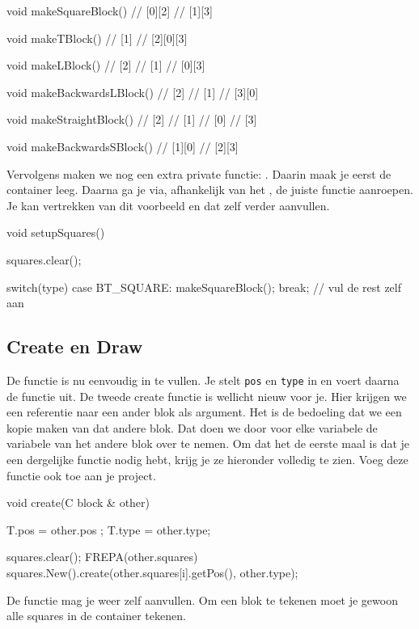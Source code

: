 \begin{code}
void makeSquareBlock()
{
	// [0][2]
	// [1][3]
}

void makeTBlock()
{
	//    [1]
	// [2][0][3]
}

void makeLBlock()
{
	// [2]
	// [1]
	// [0][3]  
}

void makeBackwardsLBlock()
{
	//    [2]
	//    [1]
	// [3][0]  
}

void makeStraightBlock()
{
	// [2]
	// [1]
	// [0]
	// [3] 
}

void makeBackwardsSBlock() 
{
	// [1][0]
	//    [2][3]
}
\end{code}

Vervolgens maken we nog een extra private functie: . Daarin maak je eerst de  container leeg. Daarna ga je via, afhankelijk van het , de juiste functie aanroepen. Je kan vertrekken van dit voorbeeld en dat zelf verder aanvullen.

\begin{code}
void setupSquares()
{
	 squares.clear();
	
	 switch(type)
	 {
	 	  case BT_SQUARE: makeSquareBlock(); break;
			// vul de rest zelf aan
	 }
}
\end{code}

\subsection{Create en Draw}
De  functie is nu eenvoudig in te vullen. Je stelt \verb|pos| en \verb|type| in en voert daarna de functie  uit. De tweede create functie is wellicht nieuw voor je. Hier krijgen we een referentie naar een ander blok als argument. Het is de bedoeling dat we een kopie maken van dat andere blok. Dat doen we door voor elke variabele de variabele van het andere blok over te nemen. Om dat het de eerste maal is dat je een dergelijke functie nodig hebt, krijg je ze hieronder volledig te zien. Voeg deze functie ook toe aan je project.

\begin{code}
void create(C block & other)
{
   T.pos  = other.pos ;
   T.type = other.type;
   
   squares.clear();
   FREPA(other.squares)
   {
      squares.New().create(other.squares[i].getPos(), other.type);
   }
}
\end{code}

De  functie mag je weer zelf aanvullen. Om een blok te tekenen moet je gewoon alle squares in de container tekenen.


